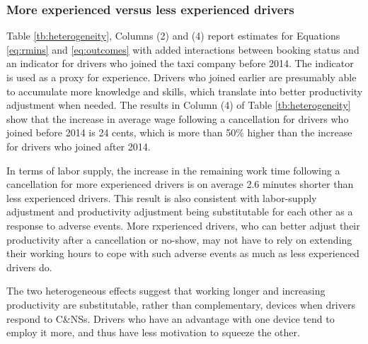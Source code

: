 \documentclass[reviewmode]{AEA}
\begin{document}
\subsubsection{More experienced versus less experienced drivers}

Table \ref{tb:heterogeneity}, Columns (2) and (4) report estimates for Equations \eqref{eq:rmins} and \eqref{eq:outcomes} with added interactions between booking status and an indicator for drivers who joined the taxi company before 2014. The indicator is used as a proxy for experience. Drivers who joined earlier are presumably able to accumulate more knowledge and skills, which translate into better productivity adjustment when needed. The results in Column (4) of Table \ref{tb:heterogeneity} show that the increase in average wage following a cancellation for drivers who joined before 2014 is 24 cents, which is more than 50\% higher than the increase for drivers who joined after 2014.

In terms of labor supply, the increase in the remaining work time following a cancellation for more experienced drivers is on average 2.6 minutes shorter than less experienced drivers. This result is also consistent with labor-supply adjustment and productivity adjustment being substitutable for each other as a response to adverse events. More rxperienced drivers, who can better adjust their productivity after a cancellation or no-show, may not have to rely on extending their working hours to cope with such adverse events as much as less experienced drivers do.


The two heterogeneous effects suggest that working longer and increasing productivity are substitutable, rather than complementary, devices when drivers respond to C\&NSs. Drivers who have an advantage with one device tend to employ it more, and thus have less motivation to squeeze the other.


\end{document}
